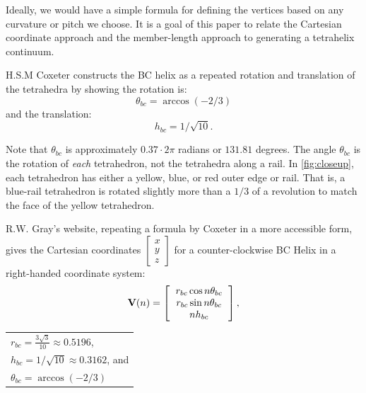 \documentclass[twocolumn,10pt]{asme2ej}
\renewcommand{\vec}[1]{\mathbf{#1}}
\begin{document}
Ideally, we would have a simple formula for defining the vertices based on
any curvature or pitch we choose. It is a goal of
this paper to relate the Cartesian coordinate approach and the member-length approach to
generating a tetrahelix continuum.


H.S.M Coxeter constructs the BC helix\cite{coxeter1985simplicial} as a repeated rotation and translation of the tetrahedra by showing the
rotation is:
\begin{equation}
\theta_{bc} = \arccos(-2/3) 
\end{equation}
and the translation:
\begin{equation}
h_{bc} = 1/\sqrt{10}.
\end{equation}

Note that $\theta_{bc}$ is approximately $0.37 \cdot 2 \pi$ radians or  $131.81$ degrees.
The angle $\theta_{bc}$ is the rotation of \emph{each} tetrahedron, not the tetrahedra along a rail.  In \cref{fig:closeup},
each tetrahedron has either a yellow, blue, or red outer edge or rail.
That is, a blue-rail tetrahedron is rotated slightly more than a $1/3$ of a revolution to match the face of the yellow tetrahedron.

R.W. Gray's website\cite{graytetrahelix}, repeating a formula by Coxeter\cite{coxeter1985simplicial} in a more accessible form, gives the Cartesian coordinates $\begin{bmatrix}
           x \\
           y \\
           z
         \end{bmatrix}$
for a counter-clockwise BC Helix in a right-handed coordinate system:
\begin{equation}
  \label{graycoxeter}
\vec{V}(n) =
\left [
  \begin{tabular}{c}
   $ r_{bc} \cos{n \theta_{bc}} $\\
   $ r_{bc} \sin{n \theta_{bc}} $\\
   $ n h_{bc}  $
  \end{tabular}
  \right ],
\end{equation}
  \begin{tabular}{l}
 $ r_{bc} = \frac{3\sqrt{3}}{10} \approx 0.5196 $,\\
 $ h_{bc} = 1/\sqrt{10} \approx 0.3162 $, and \\
 $ \theta_{bc} = \arccos(-2/3) $  \text{,}\\
  \end{tabular}      
\end{document}
